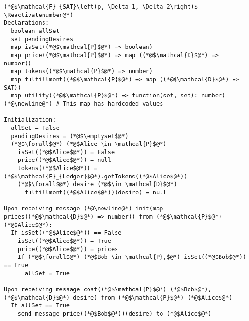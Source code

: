 \Suppressnumber
\begin{lstlisting}[label=satfunc, style=numbers]
(*@$\mathcal{F}_{SAT}\left(p, \Delta_1, \Delta_2\right)$ \Reactivatenumber@*)
Declarations:
  boolean allSet
  set pendingDesires
  map isSet((*@$\mathcal{P}$@*) => boolean)
  map price((*@$\mathcal{P}$@*) => map ((*@$\mathcal{D}$@*) => number))
  map tokens((*@$\mathcal{P}$@*) => number)
  map fulfillment((*@$\mathcal{P}$@*) => map ((*@$\mathcal{D}$@*) => SAT))
  map utility((*@$\mathcal{P}$@*) => function(set, set): number) (*@\newline@*) # This map has hardcoded values

Initialization:
  allSet = False
  pendingDesires = (*@$\emptyset$@*)
  (*@$\forall$@*) (*@$Alice \in \mathcal{P}$@*)
    isSet((*@$Alice$@*)) = False
    price((*@$Alice$@*)) = null
    tokens((*@$Alice$@*)) = (*@$\mathcal{F}_{Ledger}$@*).getTokens((*@$Alice$@*))
    (*@$\forall$@*) desire (*@$\in \mathcal{D}$@*)
      fulfillment((*@$Alice$@*))(desire) = null

Upon receiving message (*@\newline@*) init(map prices((*@$\mathcal{D}$@*) => number)) from (*@$\mathcal{P}$@*) (*@$Alice$@*):
  If isSet((*@$Alice$@*)) == False
    isSet((*@$Alice$@*)) = True
    price((*@$Alice$@*)) = prices
    If (*@$\forall$@*) (*@$Bob \in \mathcal{P},$@*) isSet((*@$Bob$@*)) == True
      allSet = True

Upon receiving message cost((*@$\mathcal{P}$@*) (*@$Bob$@*), (*@$\mathcal{D}$@*) desire) from (*@$\mathcal{P}$@*) (*@$Alice$@*):
  If allSet == True
    send message price((*@$Bob$@*))(desire) to (*@$Alice$@*)


\end{lstlisting}
